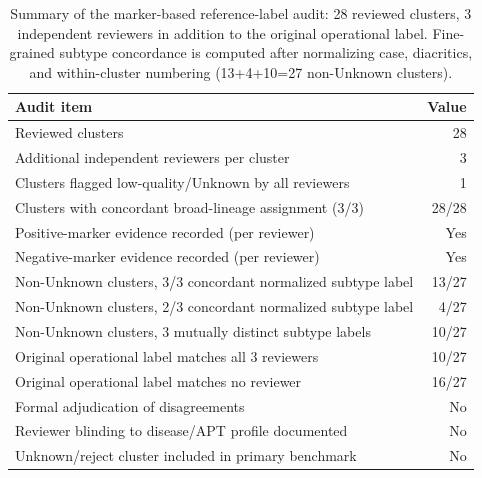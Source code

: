 \begin{table}[t]
\centering
\caption{Summary of the marker-based reference-label audit: 28 reviewed
clusters, 3 independent reviewers in addition to the original operational
label. Fine-grained subtype concordance is computed after normalizing case,
diacritics, and within-cluster numbering (13+4+10=27 non-Unknown clusters).}
\label{tab:annotation_audit}
\begin{tabular}{lr}
\toprule
Audit item & Value \\
\midrule
Reviewed clusters & 28 \\
Additional independent reviewers per cluster & 3 \\
Clusters flagged low-quality/Unknown by all reviewers & 1 \\
Clusters with concordant broad-lineage assignment (3/3) & 28/28 \\
Positive-marker evidence recorded (per reviewer) & Yes \\
Negative-marker evidence recorded (per reviewer) & Yes \\
Non-Unknown clusters, 3/3 concordant normalized subtype label & 13/27 \\
Non-Unknown clusters, 2/3 concordant normalized subtype label & 4/27 \\
Non-Unknown clusters, 3 mutually distinct subtype labels & 10/27 \\
Original operational label matches all 3 reviewers & 10/27 \\
Original operational label matches no reviewer & 16/27 \\
Formal adjudication of disagreements & No \\
Reviewer blinding to disease/APT profile documented & No \\
Unknown/reject cluster included in primary benchmark & No \\
\bottomrule
\end{tabular}
\end{table}
